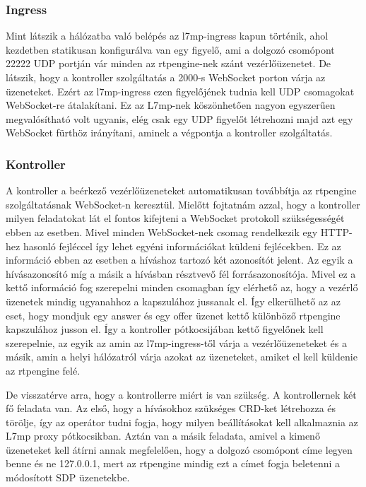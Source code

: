 \subsubsection{Ingress}

Mint látszik a hálózatba való belépés az l7mp-ingress kapun történik, ahol kezdetben
statikusan konfigurálva van egy figyelő, ami a dolgozó csomópont 22222 UDP portján
vár minden az rtpengine-nek szánt vezérlőüzenetet. De látszik, hogy a kontroller szolgáltatás
a 2000-s WebSocket porton várja az üzeneteket. Ezért az l7mp-ingress ezen figyelőjének 
tudnia kell UDP csomagokat WebSocket-re átalakítani. Ez az L7mp-nek köszönhetően nagyon
egyszerűen megvalósítható volt ugyanis, elég csak egy UDP figyelőt létrehozni majd azt 
egy WebSocket fürthöz irányítani, aminek a végpontja a kontroller szolgáltatás. 


\subsubsection{Kontroller}
A kontroller a beérkező vezérlőüzeneteket automatikusan továbbítja az rtpengine 
szolgáltatásnak WebSocket-n keresztül. Mielőtt fojtatnám azzal, hogy a kontroller milyen 
feladatokat lát el fontos kifejteni a WebSocket protokoll szükségességét ebben az esetben.
Mivel minden WebSocket-nek  csomag rendelkezik egy HTTP-hez hasonló fejléccel így
lehet egyéni információkat küldeni fejlécekben. Ez az információ ebben az esetben a híváshoz
tartozó  két azonosítót jelent. Az egyik a hívásazonosító míg a másik a hívásban résztvevő
fél forrásazonosítója. Mivel ez a kettő információ fog szerepelni minden csomagban így elérhető az,
hogy a vezérlő üzenetek mindig ugyanahhoz a kapszulához jussanak el. Így elkerülhető az
az eset, hogy mondjuk egy answer és egy offer üzenet kettő különböző rtpengine kapszulához
jusson el. Így a kontroller pótkocsijában kettő figyelőnek kell szerepelnie, az egyik
az amin az l7mp-ingress-től várja a vezérlőüzeneteket és a másik, amin a helyi hálózatról
várja azokat az üzeneteket, amiket el kell küldenie az rtpengine felé. 

De visszatérve arra, hogy a kontrollerre miért is van szükség. A kontrollernek két fő feladata
van. Az első, hogy a hívásokhoz szükséges CRD-ket létrehozza és törölje, így az operátor tudni fogja,
hogy milyen beállításokat kell alkalmaznia az L7mp proxy pótkocsikban. Aztán van a másik feladata,
amivel a kimenő üzeneteket kell átírni annak megfelelően, hogy a dolgozó csomópont
címe legyen benne és ne 127.0.0.1, mert az rtpengine mindig ezt a címet fogja beletenni
a módosított SDP üzenetekbe. 

